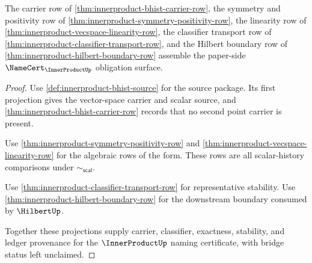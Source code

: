 \begin{theorem}
\label{thm:innerproduct-root-certificate-row}
The carrier row of \autoref{thm:innerproduct-bhist-carrier-row}, the
symmetry and positivity row of
\autoref{thm:innerproduct-symmetry-positivity-row}, the linearity row of
\autoref{thm:innerproduct-vecspace-linearity-row}, the classifier transport
row of \autoref{thm:innerproduct-classifier-transport-row}, and the Hilbert
boundary row of \autoref{thm:innerproduct-hilbert-boundary-row} assemble the
paper-side $\NameCert_{\InnerProductUp}$ obligation surface.
\end{theorem}
\begin{proof}
Use \autoref{def:innerproduct-bhist-source} for the source package. Its first
projection gives the vector-space carrier and scalar source, and
\autoref{thm:innerproduct-bhist-carrier-row} records that no second point
carrier is present.

Use \autoref{thm:innerproduct-symmetry-positivity-row} and
\autoref{thm:innerproduct-vecspace-linearity-row} for the algebraic rows of
the form. These rows are all scalar-history comparisons under
$\sim_{\mathsf{scal}}$.

Use \autoref{thm:innerproduct-classifier-transport-row} for representative
stability. Use \autoref{thm:innerproduct-hilbert-boundary-row} for the
downstream boundary consumed by $\HilbertUp$.

Together these projections supply carrier, classifier, exactness, stability,
and ledger provenance for the $\InnerProductUp$ naming certificate, with
bridge status left unclaimed.
\end{proof}

